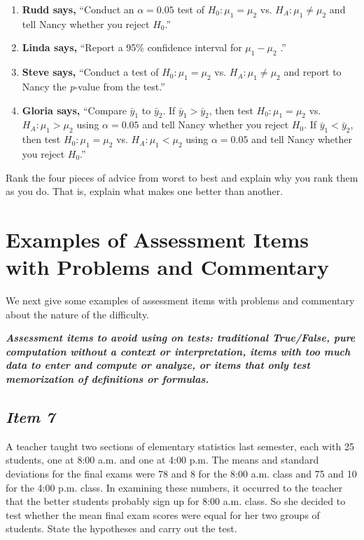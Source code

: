 \begin{enumerate}[leftmargin=1cm, itemsep=.2em]
\item \textbf{Rudd says,} ``Conduct an $\alpha=0.05$ test of $H_0: \mu_1=\mu_2$ vs. $H_A: \mu_1 \neq \mu_2$ and tell Nancy whether you reject $H_0$.''

\item \textbf{Linda says,} ``Report a 95\% confidence interval for $\mu_1 - \mu_2$ .''


\item \textbf{Steve says,} ``Conduct a test of $H_0: \mu_1=\mu_2$ vs. $H_A: \mu_1 \neq \mu_2$ and report to Nancy the \textit{p}-value from the test.''

\item \textbf{Gloria says,} ``Compare $\bar{y}_1$  to $\bar{y}_2$.  If $\bar{y}_1 > \bar{y}_2$,  then test $H_0: \mu_1=\mu_2$ vs. $H_A: \mu_1 > \mu_2$ using $\alpha =0.05$ and tell Nancy whether you reject $H_0$.  If $\bar{y}_1 < \bar{y}_2$,  then test $H_0: \mu_1=\mu_2$ vs. $H_A: \mu_1 < \mu_2$ using $\alpha = 0.05$ and tell Nancy whether you reject $H_0$.''
\end{enumerate}

Rank the four pieces of advice from worst to best and explain why you rank them as you do. That is, explain what makes one better than another.


\section{\textbf{Examples of Assessment Items with Problems and Commentary}}
We next give some examples of assessment items with problems and commentary about the nature of the difficulty.

\vspace{8pt}

\textbf{\textit{Assessment items to avoid using on tests: traditional True/False, pure computation without a context or interpretation, items with too much data to enter and compute or analyze, or items that only test memorization of definitions or formulas.}}

\subsection{\textbf{\textit{Item 7}}}
A teacher taught two sections of elementary statistics last semester, each with 25 students, one at 8:00 a.m. and one at 4:00 p.m. The means and standard deviations for the final exams were 78 and 8 for the 8:00 a.m. class and 75 and 10 for the 4:00 p.m. class. In examining these numbers, it occurred to the teacher that the better students probably sign up for 8:00 a.m. class. So she decided to test whether the mean final exam scores were equal for her two groups of students. State the hypotheses and carry out the test.

